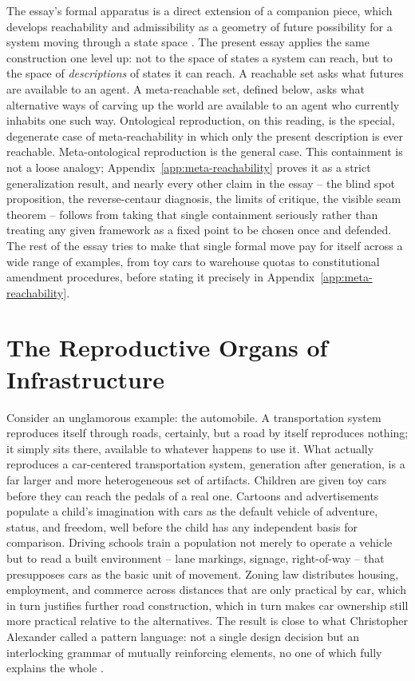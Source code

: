 \documentclass[11pt]{article}
\theoremstyle{plain}
\begin{document}
The essay's formal apparatus is a direct extension of a companion piece, which develops reachability and admissibility as a geometry of future possibility for a system moving through a state space \cite{flyxion2026cone}. The present essay applies the same construction one level up: not to the space of states a system can reach, but to the space of \emph{descriptions} of states it can reach. A reachable set asks what futures are available to an agent. A meta-reachable set, defined below, asks what alternative ways of carving up the world are available to an agent who currently inhabits one such way. Ontological reproduction, on this reading, is the special, degenerate case of meta-reachability in which only the present description is ever reachable. Meta-ontological reproduction is the general case. This containment is not a loose analogy; Appendix~\ref{app:meta-reachability} proves it as a strict generalization result, and nearly every other claim in the essay -- the blind spot proposition, the reverse-centaur diagnosis, the limits of critique, the visible seam theorem -- follows from taking that single containment seriously rather than treating any given framework as a fixed point to be chosen once and defended. The rest of the essay tries to make that single formal move pay for itself across a wide range of examples, from toy cars to warehouse quotas to constitutional amendment procedures, before stating it precisely in Appendix~\ref{app:meta-reachability}.

\section{The Reproductive Organs of Infrastructure}
\label{sec:infra-organs}

Consider an unglamorous example: the automobile. A transportation system reproduces itself through roads, certainly, but a road by itself reproduces nothing; it simply sits there, available to whatever happens to use it. What actually reproduces a car-centered transportation system, generation after generation, is a far larger and more heterogeneous set of artifacts. Children are given toy cars before they can reach the pedals of a real one. Cartoons and advertisements populate a child's imagination with cars as the default vehicle of adventure, status, and freedom, well before the child has any independent basis for comparison. Driving schools train a population not merely to operate a vehicle but to read a built environment -- lane markings, signage, right-of-way -- that presupposes cars as the basic unit of movement. Zoning law distributes housing, employment, and commerce across distances that are only practical by car, which in turn justifies further road construction, which in turn makes car ownership still more practical relative to the alternatives. The result is close to what Christopher Alexander called a pattern language: not a single design decision but an interlocking grammar of mutually reinforcing elements, no one of which fully explains the whole \cite{alexander1977}.
\end{document}

